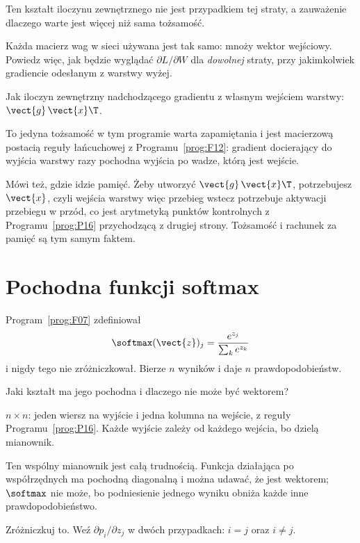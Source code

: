 \begin{fr}
Ten kształt iloczynu zewnętrznego nie jest przypadkiem tej straty, a
zauważenie dlaczego warte jest więcej niż sama tożsamość.

Każda macierz wag w sieci używana jest tak samo: mnoży wektor wejściowy.
Powiedz więc, jak będzie wyglądać $\partial L/\partial W$ dla
\emph{dowolnej} straty, przy jakimkolwiek gradiencie odesłanym z warstwy
wyżej.
\dotline
\nextframe
\end{fr}

\begin{fr}
\begin{ansblock}
Jak iloczyn zewnętrzny nadchodzącego gradientu z własnym wejściem warstwy:
$\vect{g}\,\vect{x}\T$.
\end{ansblock}

To jedyna tożsamość w tym programie warta zapamiętania i jest macierzową
postacią reguły łańcuchowej z Programu~\ref{prog:F12}: gradient docierający
do wyjścia warstwy razy pochodna wyjścia po wadze, którą jest wejście.

\begin{note}
Mówi też, gdzie idzie pamięć. Żeby utworzyć $\vect{g}\,\vect{x}\T$,
potrzebujesz $\vect{x}$, czyli wejścia warstwy \dash{} więc przebieg wstecz
potrzebuje aktywacji przebiegu w przód, co jest arytmetyką punktów kontrolnych
z Programu~\ref{prog:P16} przychodzącą z drugiej strony. Tożsamość i rachunek
za pamięć są tym samym faktem.
\end{note}
\end{fr}

\section{Pochodna funkcji softmax}
\label{sec:P18-softmax-jacobian}

\begin{fr}
Program~\ref{prog:F07} zdefiniował
\[ \softmax(\vect{z})_j = \frac{e^{z_j}}{\sum_k e^{z_k}} \]
i nigdy tego nie zróżniczkował. Bierze $n$ wyników i daje $n$
prawdopodobieństw.

Jaki kształt ma jego pochodna i dlaczego nie może być wektorem?
\nextframe
\end{fr}

\begin{fr}
\begin{ansblock}
$n \times n$: jeden wiersz na wyjście i jedna kolumna na wejście, z reguły
Programu~\ref{prog:P16}. Każde wyjście zależy od każdego wejścia, bo dzielą
mianownik.
\end{ansblock}

Ten wspólny mianownik jest całą trudnością. Funkcja działająca po
współrzędnych ma pochodną diagonalną i można udawać, że jest wektorem;
$\softmax$ nie może, bo podniesienie jednego wyniku obniża każde inne
prawdopodobieństwo.

Zróżniczkuj to. Weź $\partial p_i / \partial z_j$ w dwóch przypadkach:
$i = j$ oraz $i \neq j$.
\dotline
\nextframe
\end{fr}

